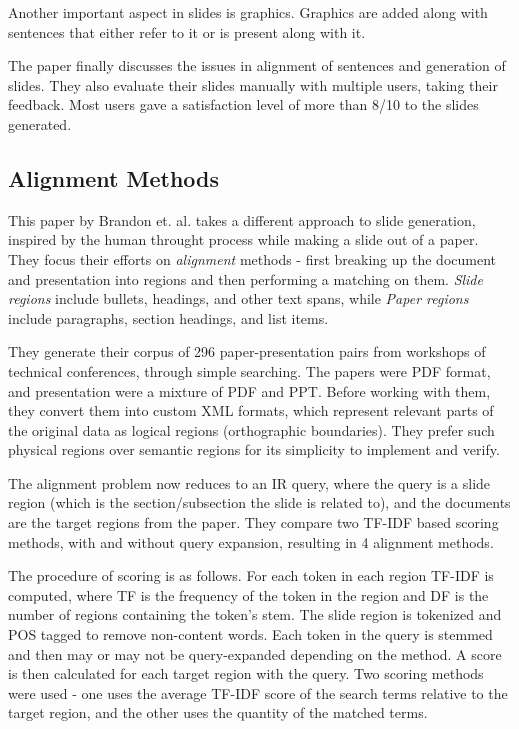 \documentclass[conference]{IEEEtran}
\begin{document}
Another important aspect in slides is graphics. Graphics are added along with sentences 
that either refer to it or is present along with it.

The paper finally discusses the issues in alignment of sentences and generation of slides.
They also evaluate their slides manually with multiple users, taking their feedback.
Most users gave a satisfaction level of more than 8/10 to the slides generated.

\subsection{Alignment Methods}
This paper by Brandon et. al. \cite{brandon} takes a different approach to slide generation,
inspired by the human throught process while making a slide out of a paper.
They focus their efforts on \textit{alignment} methods - first breaking up the document and
presentation into regions and then performing a matching on them.
\textit{Slide regions} include bullets, headings, and other text spans, while \textit{Paper regions}
include paragraphs, section headings, and list items.

They generate their corpus of 296 paper-presentation pairs from workshops of technical conferences,
through simple searching. The papers were PDF format, and presentation were a mixture of PDF and PPT.
Before working with them, they convert them into custom XML formats, which represent relevant parts of
the original data as logical regions (orthographic boundaries). They prefer such physical regions over
semantic regions for its simplicity to implement and verify.

The alignment problem now reduces to an IR query, where the query is a slide region (which is the
section/subsection the slide is related to), and the documents are the target regions from the paper.
They compare two TF-IDF based scoring methods, with and without query expansion, resulting in 4
alignment methods.

The procedure of scoring is as follows. For each token in each region TF-IDF is computed, where TF is
the frequency of the token in the region and DF is the number of regions containing the token's stem.
The slide region is tokenized and POS tagged to remove non-content words. Each token in the query is
stemmed and then may or may not be query-expanded depending on the method. A score is then calculated
for each target region with the query. Two scoring methods were used - one uses the average TF-IDF
score of the search terms relative to the target region, and the other uses the quantity of the matched
terms.
\end{document}
